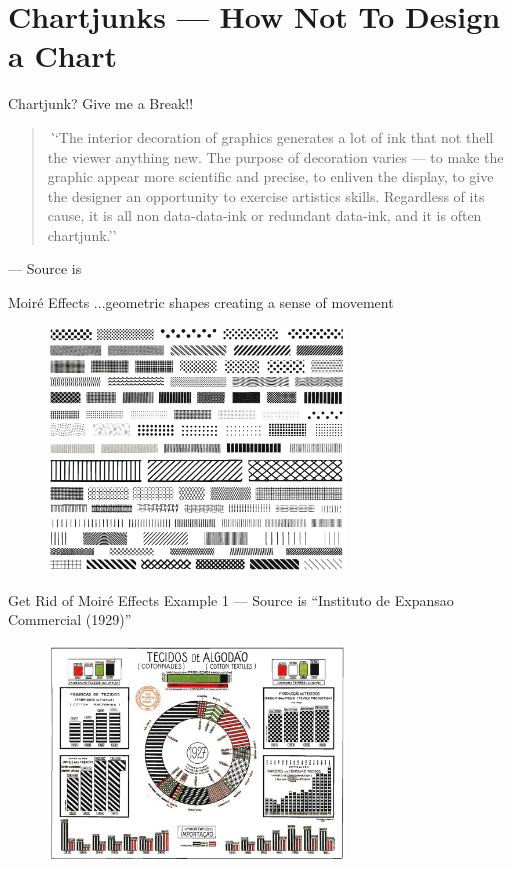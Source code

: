 \documentclass[notes, aspectratio=1610]{beamer}
\begin{document}
\section{Chartjunks --- How Not To Design a Chart}

\begin{frame}{Chartjunk? Give me a Break!!}{}
	\begin{quote}
		\textit
		``The interior decoration of graphics generates a lot of ink that not thell the
		viewer anything new. The purpose of decoration varies — to make the graphic
		appear more scientific and precise, to enliven the display, to give the designer
		an opportunity to exercise artistics skills. Regardless of its cause, it is all
		non data-data-ink or redundant data-ink, and it is often chartjunk.''
	\end{quote}

	\raggedleft --- Source is \cite[][page 107]{tufte2001}
\end{frame}	

\begin{frame}
	{Moir\'e Effects}
	{...geometric shapes creating a sense of movement}
	\begin{figure}
		\begin{center}
			\includegraphics[width=0.7\textwidth]
			{images/moire_effects.png}
		\end{center}
	\end{figure}
\end{frame}

\begin{frame}
	{Get Rid of Moir\'e Effects}
	{Example 1 --- Source is ``Instituto de Expansao Commercial (1929)''}
	\centering
	\begin{figure}
	\includegraphics[width=0.7\textwidth]{images/moire_effect_1.png}
	\end{figure}
\end{frame}
\end{document}
